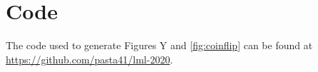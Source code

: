 \documentclass[sigplan,screen]{acmart}
\begin{document}
\section*{Code}
The code used to generate Figures \color{red}Y\color{black} and \ref{fig:coinflip} can be found at \url{https://github.com/pasta41/lml-2020}.



\end{document}
